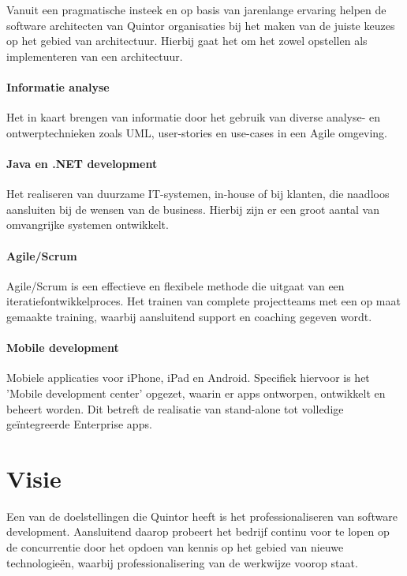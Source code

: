 Vanuit een pragmatische insteek en op basis van jarenlange ervaring helpen de software architecten van Quintor organisaties bij het maken van de juiste keuzes op het gebied van architectuur. Hierbij gaat het om het zowel opstellen als implementeren van een architectuur.

\paragraph{Informatie analyse}

Het in kaart brengen van informatie door het gebruik van diverse analyse- en ontwerptechnieken zoals UML, user-stories en use-cases in een Agile omgeving.

\paragraph{Java en .NET development}

Het realiseren van duurzame IT-systemen, in-house of bij klanten, die naadloos aansluiten bij de wensen van de business. Hierbij zijn er een groot aantal van omvangrijke systemen ontwikkelt.

\paragraph{Agile/Scrum}

Agile/Scrum is een effectieve en flexibele methode die uitgaat van een iteratiefontwikkelproces. Het trainen van complete projectteams met een op maat gemaakte training, waarbij aansluitend support en coaching gegeven wordt.

\paragraph{Mobile development}

Mobiele applicaties voor iPhone, iPad en Android. Specifiek hiervoor is het 'Mobile development center' opgezet, waarin er apps ontworpen, ontwikkelt en beheert worden. Dit betreft de realisatie van stand-alone tot volledige geïntegreerde Enterprise apps.

\section{Visie}

Een van de doelstellingen die Quintor heeft is het professionaliseren van software development. Aansluitend daarop probeert het bedrijf continu voor te lopen op de concurrentie door het opdoen van kennis op het gebied van nieuwe technologieën, waarbij professionalisering van de werkwijze voorop staat.

